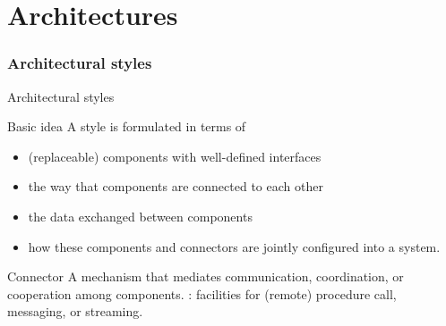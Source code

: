 \part{Architectures}
\section{Architectural styles}
\begin{slide}{Architectural styles}
  \begin{block}{Basic idea} 
    A style is formulated in terms of
    \begin{itemize}\tightlist
    \item (replaceable) components with well-defined interfaces
    \item the way that components are connected to each other
    \item the data exchanged between components
    \item how these components and connectors are jointly configured into a system.
    \end{itemize}
  \end{block}
  \begin{block}{Connector}
    A mechanism that mediates communication, coordination, or cooperation among components. :
    facilities for (remote) procedure call, messaging, or streaming.
  \end{block}
\end{slide}
